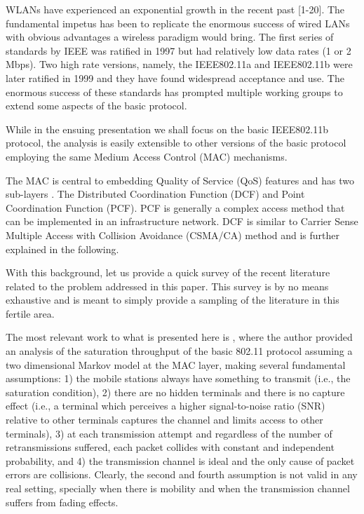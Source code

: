 \documentclass[10pt,onecolumn,a4paper]{IEEEtran}
\begin{document}
WLANs have experienced an exponential growth in the recent past
[1-20]. The fundamental impetus has been to replicate the enormous
success of wired LANs with obvious advantages a wireless paradigm
would bring. The first series of standards by IEEE was ratified in
1997 but had relatively low data rates (1 or 2 Mbps). Two high
rate versions, namely, the IEEE802.11a and IEEE802.11b were later
ratified in 1999 and they have found widespread acceptance and
use. The enormous success of these standards has prompted multiple
working groups to extend some aspects of the basic protocol.

While in the ensuing presentation we shall focus on the basic
IEEE802.11b protocol, the analysis is easily extensible to other
versions of the basic protocol employing the same Medium Access
Control (MAC) mechanisms.

The MAC is central to embedding Quality of Service (QoS) features
and has two sub-layers \cite{standard_DCF_MAC}. The Distributed
Coordination Function (DCF) and Point Coordination Function (PCF).
PCF is generally a complex access method that can be implemented
in an infrastructure network. DCF is similar to Carrier Sense
Multiple Access with Collision Avoidance (CSMA/CA) method and is
further explained in the following.

With this background, let us provide a quick survey of the recent
literature related to the problem addressed in this paper. This
survey is by no means exhaustive and is meant to simply provide a
sampling of the literature in this fertile area.

The most relevant work to what is presented here is
\cite{Bianchi}, where the author
provided an analysis of the saturation throughput
of the basic 802.11 protocol assuming a two dimensional Markov
model at the MAC layer, making several fundamental assumptions: 1)
the mobile stations always have something to transmit (i.e., the
saturation condition), 2) there are no hidden terminals and there
is no capture effect (i.e., a terminal which perceives a higher
signal-to-noise ratio (SNR) relative to other terminals captures
the channel \cite{capture,zorzi_rao,Spasenovski} and limits access
to other terminals), 3) at each transmission attempt and
regardless of the number of retransmissions suffered, each packet
collides with constant and independent probability, and 4) the
transmission channel is ideal and the only cause of packet errors
are collisions. Clearly, the second and fourth assumption is not
valid in any real setting, specially when there is mobility and
when the transmission channel suffers from fading effects.
\end{document}
